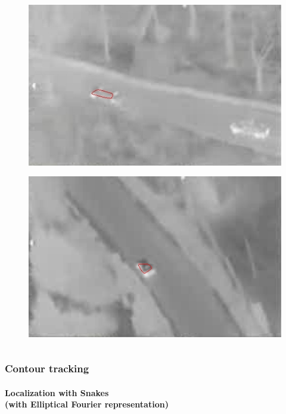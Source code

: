 \begin{frame}
\begin{columns}
\begin{column}{1in}
\begin{figure}
				\includegraphics[width=1.5\textwidth]{figs/TRK_IGARSS2010_00030_contour.jpg}
			\end{figure}
			\begin{figure}
				\includegraphics[width=1.5\textwidth]{figs/TRK_IGARSS2010_01277_contour.jpg}
			\end{figure}
		\end{column}			
	\end{columns}
\end{frame}




\begin{frame}
\frametitle{Contour tracking}
\framesubtitle{Localization with Snakes \\{\small(with Elliptical Fourier representation)}}
\logoCSIPCPL\mypagenum
\end{frame}


